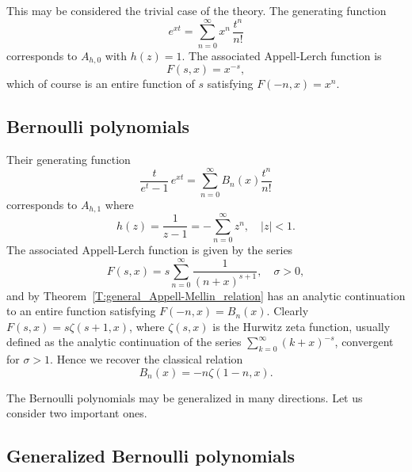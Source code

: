 \documentclass[11pt,a4paper]{amsart}
\theoremstyle{plain}
\theoremstyle{plain}
\theoremstyle{definition}
\theoremstyle{remark}
\begin{document}
This may be considered the trivial case of the theory. The generating function
\[
	e^{xt} = \sum_{n=0}^\infty x^n \, \frac{t^n}{n!}
\]
corresponds to $A_{h,0}$ with $h(z) = 1$. The associated Appell-Lerch function is
\[
	F(s,x) = x^{-s},
\]
which of course is an entire function of $s$ satisfying $F(-n,x)=x^{n}$.



\subsection{Bernoulli polynomials}
\label{subsec:Bernoulli}


Their generating function
\begin{equation*}
  \frac{t}{e^t-1}\,e^{xt} = \sum_{n=0}^\infty B_{n}(x)\frac{t^n}{n!}
\end{equation*}
corresponds to $A_{h,1}$ where
\[
	h(z) = \frac{1}{z-1} = -\sum_{n=0}^\infty z^n, \quad |z|<1.
\]
The associated Appell-Lerch function is given by the series
% 
\begin{equation*}
	F(s,x) = s\sum_{n=0}^\infty \frac{1}{(n + x)^{s+1}},\quad \sigma>0,
\end{equation*}
% 
and by Theorem~\ref{T:general_Appell-Mellin_relation} has an analytic continuation to an entire function satisfying $F(-n,x)=B_{n}(x)$. Clearly $F(s,x) = s \zeta(s+1,x)$, where $\zeta(s,x)$ is the Hurwitz zeta function, usually defined as the analytic continuation of the series $\sum_{k=0}^{\infty} (k + x)^{-s}$, convergent for $\sigma > 1$. Hence we recover the classical relation
% 
\begin{equation}
\label{E:Bernoulli_Zeta}
	B_{n}(x) = -n\zeta(1-n,x).
\end{equation}


The Bernoulli polynomials may be generalized in many directions. Let us consider two important ones.


\subsection{Generalized Bernoulli polynomials}
\label{subsec:BernoulliGen}
\end{document}

